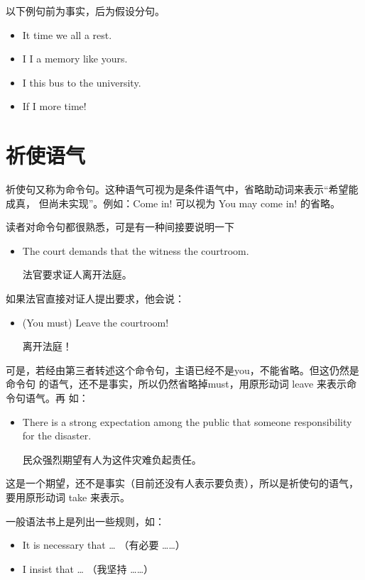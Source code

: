  以下例句前为事实，后为假设分句。
\begin{itemize}
\item It time we all  a rest.

\item I  I  a memory like yours.

\item I  this bus  to the university.

\item  If  I  more time!
\end{itemize}

\section{祈使语气}

祈使句又称为命令句。这种语气可视为是条件语气中，省略助动词来表示“希望能成真，
但尚未实现”。例如：Come in! 可以视为 You may come in! 的省略。

读者对命令句都很熟悉，可是有一种间接要说明一下
\begin{itemize}
\item The court demands that the witness  the courtroom.

  法官要求证人离开法庭。
\end{itemize}

如果法官直接对证人提出要求，他会说：
\begin{itemize}
\item  (You must) Leave the courtroom!

  离开法庭！
\end{itemize}
可是，若经由第三者转述这个命令句，主语已经不是you，不能省略。但这仍然是命令句
的语气，还不是事实，所以仍然省略掉must，用原形动词 leave 来表示命令句语气。再
如：
\begin{itemize}
\item There is a strong expectation among the public that someone 
  responsibility for the disaster.

  民众强烈期望有人为这件灾难负起责任。
\end{itemize}
这是一个期望，还不是事实（目前还没有人表示要负责），所以是祈使句的语气，要用原形动词
take 来表示。

一般语法书上是列出一些规则，如：
\begin{itemize}
\item  It is necessary that \ldots{} （有必要 \ldots \ldots）
\item  I insist that \ldots{} （我坚持 \ldots \ldots）
\end{itemize}

